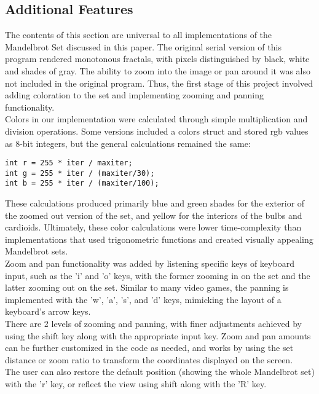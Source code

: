 \documentclass{article}
\begin{document}
\subsection{Additional Features}

The contents of this section are universal to all implementations of the Mandelbrot Set discussed in this paper. The original serial version of this program rendered monotonous fractals, with pixels distinguished by black, white and shades of gray. The ability to zoom into the image or pan around it was also not included in the original program. Thus, the first stage of this project involved adding coloration to the set and implementing zooming and panning functionality.\\

Colors in our implementation were calculated through simple multiplication and division operations. Some versions included a colors struct and stored rgb values as 8-bit integers, but the general calculations remained the same:

\begin{verbatim}
int r = 255 * iter / maxiter;
int g = 255 * iter / (maxiter/30);
int b = 255 * iter / (maxiter/100);
\end{verbatim}

These calculations produced primarily blue and green shades for the exterior of the zoomed out version of the set, and yellow for the interiors of the bulbs and cardioids. Ultimately, these color calculations were lower time-complexity than implementations that used trigonometric functions and created visually appealing Mandelbrot sets. \\

Zoom and pan functionality was added by listening specific keys of keyboard input, such as the 'i' and 'o' keys, with the former zooming in on the set and the latter zooming out on the set. Similar to many video games, the panning is implemented with the 'w', 'a', 's', and 'd' keys, mimicking the layout of a keyboard's arrow keys. \\

There are 2 levels of zooming and panning, with finer adjustments achieved by using the shift key along with the appropriate input key. Zoom and pan amounts can be further customized in the code as needed, and works by using the set distance or zoom ratio to transform the coordinates displayed on the screen.\\

The user can also restore the default position (showing the whole Mandelbrot set) with the 'r' key, or reflect the view using shift along with the 'R' key.
\end{document}
